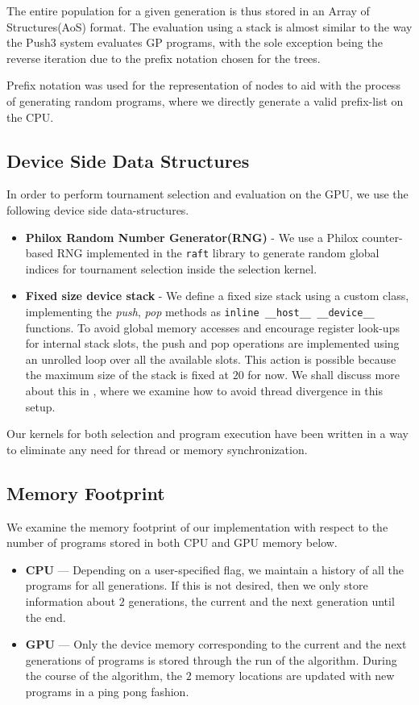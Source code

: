 The entire population for a given generation is thus stored in an Array of Structures(AoS) format. The evaluation using a stack is almost similar to the way the Push3 system \citep{push3Stack} evaluates GP programs, with the sole exception being the reverse iteration due to the prefix notation chosen for the trees. 

Prefix notation was used for the representation of nodes to aid with the process of generating random programs, where we directly generate a valid prefix-list on the CPU.

\subsection{Device Side Data Structures}
\label{ow:deviceds}
In order to perform tournament selection and evaluation on the GPU, we use the following device side data-structures. 
\begin{itemize}
  \item \textbf{Philox Random Number Generator(RNG)} - We use a Philox counter-based RNG\citep{Philox2011} implemented in the \texttt{raft} library\citep{raschka2020machine} to generate random global indices for tournament selection inside the selection kernel. 
  \item \textbf{Fixed size device stack} - We define a fixed size stack using a custom class, implementing the \textit{push}, \textit{pop} methods as \lstinline!inline __host__ __device__! functions. To avoid global memory accesses and encourage register look-ups for internal stack slots, the push and pop operations are implemented using an unrolled loop over all the available slots. This action is possible because the maximum size of the stack is fixed at $20$ for now. We shall discuss more about this in , where we examine how to avoid thread divergence in this setup.
\end{itemize}

Our kernels for both selection and program execution have been written in a way to eliminate any need for thread or memory synchronization. 

\subsection{Memory Footprint}
\label{ow:memory}
We examine the memory footprint of our implementation with respect to the number of programs stored in both CPU and GPU memory below. 
\begin{itemize}
  \item \textbf{CPU} --- Depending on a user-specified flag, we maintain a history of all the programs for all generations. If this is not desired, then we only store information about $2$ generations, the current and the next generation until the end.
  \item \textbf{GPU} --- Only the device memory corresponding to the current and the next generations of programs is stored through the run of the algorithm. During the course of the algorithm, the $2$ memory locations are updated with new programs in a ping pong fashion.
\end{itemize}

